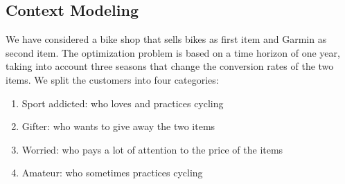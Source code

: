 \subsection{Context Modeling}
We have considered a bike shop that sells bikes as first item and Garmin as second item. The optimization problem is based on a time horizon of one year, taking into account three seasons that change the conversion rates of the two items. We split the customers into four categories:
\begin{enumerate}
	\item Sport addicted: who loves and practices cycling
	\item Gifter: who wants to give away the two items
	\item Worried: who pays a lot of attention to the price of the items
	\item Amateur: who sometimes practices cycling
\end{enumerate}
